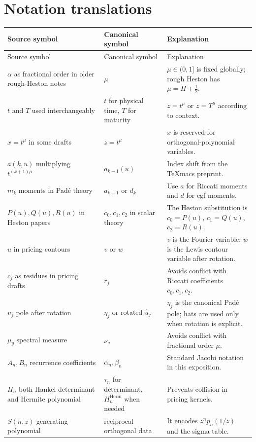 \documentclass[11pt]{article}
\theoremstyle{definition}
\begin{document}
\section{Notation translations}

\begin{longtable}{p{}p{}p{}}
\toprule
Source symbol & Canonical symbol & Explanation\\
\midrule
\endfirsthead
\toprule
Source symbol & Canonical symbol & Explanation\\
\midrule
\endhead
$\alpha$ as fractional order in older rough-Heston notes & $\mu$ & $\mu\in(0,1]$ is fixed globally; rough Heston has $\mu=H+\tfrac12$.\\
$t$ and $T$ used interchangeably & $t$ for physical time, $T$ for maturity & $z=t^\mu$ or $z=T^\mu$ according to context.\\
$x=t^\mu$ in some drafts & $z=t^\mu$ & $x$ is reserved for orthogonal-polynomial variables.\\
$a(k,u)$ multiplying $t^{(k+1)\mu}$ & $a_{k+1}(u)$ & Index shift from the TeXmacs preprint.\\
$m_k$ moments in Padé theory & $a_{k+1}$ or $d_k$ & Use $a$ for Riccati moments and $d$ for cgf moments.\\
$P(u),Q(u),R(u)$ in Heston papers & $c_0,c_1,c_2$ in scalar theory & The Heston substitution is $c_0=P(u)$, $c_1=Q(u)$, $c_2=R(u)$.\\
$u$ in pricing contours & $v$ or $w$ & $v$ is the Fourier variable; $w$ is the Lewis contour variable after rotation.\\
$c_j$ as residues in pricing drafts & $r_j$ & Avoids conflict with Riccati coefficients $c_0,c_1,c_2$.\\
$\hat u_j$ pole after rotation & $\eta_j$ or rotated $\hat u_j$ & $\eta_j$ is the canonical Padé pole; hats are used only when rotation is explicit.\\
$\mu_g$ spectral measure & $\nu_g$ & Avoids conflict with fractional order $\mu$.\\
$A_n,B_n$ recurrence coefficients & $\alpha_n,\beta_n$ & Standard Jacobi notation in this exposition.\\
$H_n$ both Hankel determinant and Hermite polynomial & $\tau_n$ for determinant, $H_n^{\mathrm{Herm}}$ when needed & Prevents collision in pricing kernels.\\
$S(n,z)$ generating polynomial & reciprocal orthogonal data & It encodes $z^np_n(1/z)$ and the sigma table.\\

\end{longtable}
\end{document}
